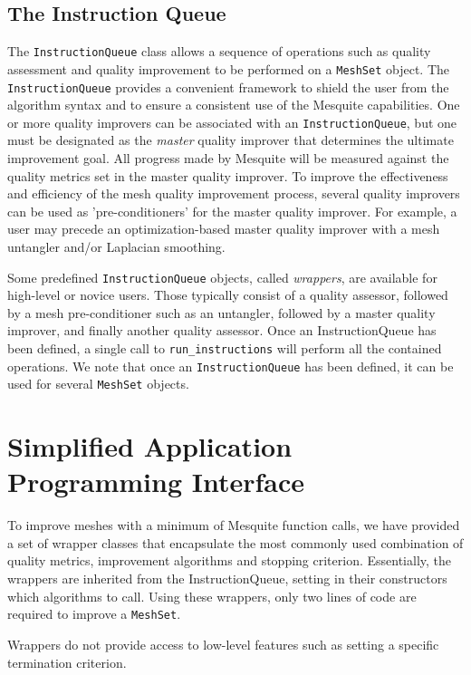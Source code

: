 \subsection{The Instruction Queue} \label{sec:IQ}

The \texttt{InstructionQueue} class allows a sequence of operations
such as quality assessment and quality improvement to be performed on
a \texttt{MeshSet} object. The \texttt{InstructionQueue} 
provides a convenient framework to shield the user
from the algorithm syntax and to ensure a consistent use of the
Mesquite capabilities.  One or more quality improvers can be
associated with an {\tt InstructionQueue}, but one must be designated
as the {\it master} quality improver that determines the ultimate 
improvement goal.  All progress made by Mesquite will be
measured against the quality metrics set in the master quality
improver.  To improve the effectiveness and efficiency of the mesh
quality improvement process, several quality improvers can be used as
'pre-conditioners' for the master quality improver.  For example, a
user may precede an optimization-based master quality improver with a
mesh untangler and/or Laplacian smoothing.

Some predefined \texttt{InstructionQueue} objects, called \emph
{wrappers}, are available for high-level or novice users. Those
typically consist of a quality assessor, followed by a mesh
pre-conditioner such as an untangler, followed by a master quality
improver, and finally another quality assessor.  Once an
InstructionQueue has been defined, a single call to \texttt{run\_instructions} 
will perform all the contained operations.  We note
that once an \texttt{InstructionQueue} has been defined, it can be used
for several \texttt{MeshSet} objects.


\section{Simplified Application Programming Interface}
\label{sec:wrappers}
To improve meshes with a minimum of Mesquite function calls, we have 
provided a set of wrapper classes that encapsulate the 
most commonly used combination of quality metrics, improvement
algorithms and stopping criterion. Essentially, the wrappers are
inherited from the InstructionQueue, setting in their constructors
which algorithms to call. Using these wrappers, only
two lines of code are required to improve a \texttt{MeshSet}.

Wrappers do not provide access to low-level 
features such as setting a specific
termination criterion.  


